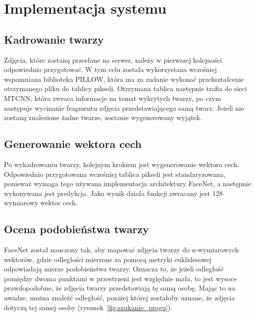 \chapter{Implementacja systemu}


\section{Kadrowanie twarzy}

Zdjęcia, które zostaną przesłane na serwer, należy w pierwszej kolejności odpowiednio przygotować.
W tym celu została wykorzystana wcześniej wspomniana biblioteka PILLOW,
która ma za zadanie wykonać przekształcenie otrzymanego pliku do tablicy pikseli.
Otrzymana tablica następnie trafia do sieci MTCNN, która zwraca informacje na temat wykrytych twarzy,
po czym następuje wycinanie fragmentu zdjęcia przedstawiającego samą twarz.
Jeżeli nie zostaną znalezione żadne twarze, zostanie wygenerowany wyjątek.


\section{Generowanie wektora cech}

Po wykadrowaniu twarzy, kolejnym krokiem jest wygenerowanie wektora cech.
Odpowiednio przygotowana wcześniej tablica pikseli jest standaryzowana,
ponieważ wymaga tego używana implementacja architektury FaceNet, a następnie wykonywana jest predykcja.
Jako wynik działa funkcji zwracany jest 128 wymiarowy wektor cech.


\pagebreak


\section{Ocena podobieństwa twarzy}

    FaceNet został nauczony tak, aby mapować zdjęcia twarzy do n-wymiarowych wektorów,
    gdzie odległości mierzone za pomocą metryki euklidesowej odpowiadają mierze podobieństwa twarzy.
Oznacza to, że jeżeli odległość pomiędzy dwoma punktami w przestrzeni
jest względnie mała, to jest wysoce prawdopodobne, że zdjęcia twarzy przedstawiają tę samą osobę.
Mając to na uwadze, można znaleźć odległość, poniżej której zostałoby uznane, że zdjęcia
dotyczą tej samej osoby (rysunek~\ref{fig:szukanie_progu}).

